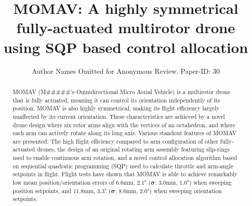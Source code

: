 \documentclass[conference]{IEEEtran}
\newcommand{\authortext}{Author Names Omitted for Anonymous Review. Paper-ID: 30}
\newcommand{\marco}{M\#\#\#\#\#}
\newcommand{\authortext}{Marco Ruggia - Institute of Photonics and Robotics, University of Applied Sciences of the Grison, Switzerland}
\newcommand{\marco}{Marco}
\begin{document}
\title{MOMAV: A highly symmetrical fully-actuated multirotor drone using SQP based control allocation}
\author{\authortext{}}
\maketitle


\begin{abstract}
	MOMAV (\marco{}'s Omnidirectional Micro Aerial Vehicle) is a multirotor drone that is fully actuated, meaning it can control its orientation independently of its position. MOMAV is also highly symmetrical, making its flight efficiency largely unaffected by its current orientation. These characteristics are achieved by a novel drone design where six rotor arms align with the vertices of an octahedron, and where each arm can actively rotate along its long axis. Various standout features of MOMAV are presented: The high flight efficiency compared to arm configuration of other fully-actuated drones, the design of an original rotating arm assembly featuring slip-rings used to enable continuous arm rotation, and a novel control allocation algorithm based on sequential quadratic programming (SQP) used to calculate throttle and arm-angle setpoints in flight. Flight tests have shown that MOMAV is able to achieve remarkably low mean position/orientation errors of 6.6mm, 2.1° ($\bm\sigma$: 3.0mm, 1.0°) when sweeping position setpoints, and 11.8mm, 3.3° ($\bm\sigma$: 8.6mm, 2.0°) when sweeping orientation setpoints.
\end{abstract}


\end{document}
